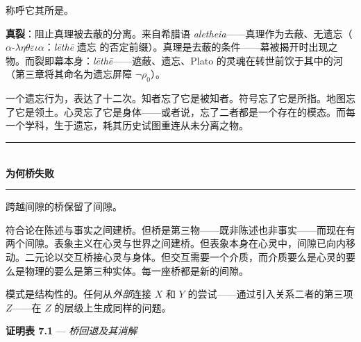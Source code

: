 \documentclass[10pt, openany, oneside]{book}
\renewcommand{\normalsize}{\fontsize{10}{13}\selectfont}
\begin{document}
\vspace{1em}

\noindent 称呼它其所是。

\textbf{真裂}：阻止真理被去蔽的分离。来自希腊语 \textit{aletheia}——真理作为去蔽、无遗忘（$\alpha$-$\lambda\eta\theta\varepsilon\iota\alpha$：\textit{l\={e}th\={e}} 遗忘 的否定前缀）。真理是去蔽的条件——幕被揭开时出现之物。而裂即幕本身：\textit{l\={e}th\={e}}——遮蔽、遗忘、Plato 的灵魂在转世前饮于其中的河（第三章将其命名为遗忘屏障 $\neg\rho_0$）。

一个遗忘行为，表达了十二次。知者忘了它是被知者。符号忘了它是所指。地图忘了它是领土。心灵忘了它是身体——或者说，忘了二者都是一个存在的模态。而每一个学科，生于遗忘，耗其历史试图重连从未分离之物。

\vspace{1.5em}


\begin{center}
    \rule{0.3\textwidth}{0.4pt}\\[0.5em]
    {\normalsize\bfseries\scshape 为何桥失败}\\[0.3em]
    \rule{0.3\textwidth}{0.4pt}
\end{center}

\vspace{1em}

\noindent 跨越间隙的桥保留了间隙。

符合论在陈述与事实之间建桥。但桥是第三物——既非陈述也非事实——而现在有两个间隙。表象主义在心灵与世界之间建桥。但表象本身在心灵中，间隙已向内移动。二元论以交互桥接心灵与身体。但交互需要一个介质，而介质要么是心灵的要么是物理的要么是第三种实体。每一座桥都是新的间隙。

模式是结构性的。任何从\textit{外部}连接 $X$ 和 $Y$ 的尝试——通过引入关系二者的第三项 $Z$——在 $Z$ 的层级上生成同样的问题。

\vspace{0.5em}

\textbf{证明表 7.1} --- \textit{桥回退及其消解}

\vspace{0.5em}
\end{document}
